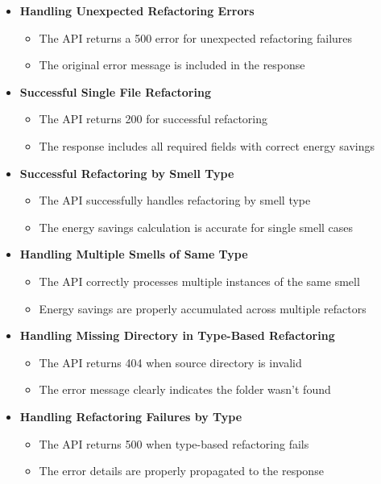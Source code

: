 \documentclass[12pt, titlepage]{article}
\begin{document}
\begin{itemize}
    \item \textbf{Handling Unexpected Refactoring Errors}
        \begin{itemize}
            \item The API returns a 500 error for unexpected refactoring failures
            \item The original error message is included in the response
        \end{itemize}

    \item \textbf{Successful Single File Refactoring}
        \begin{itemize}
            \item The API returns 200 for successful refactoring
            \item The response includes all required fields with correct energy savings
        \end{itemize}

    \item \textbf{Successful Refactoring by Smell Type}
        \begin{itemize}
            \item The API successfully handles refactoring by smell type
            \item The energy savings calculation is accurate for single smell cases
        \end{itemize}

    \item \textbf{Handling Multiple Smells of Same Type}
        \begin{itemize}
            \item The API correctly processes multiple instances of the same smell
            \item Energy savings are properly accumulated across multiple refactors
        \end{itemize}

    \item \textbf{Handling Missing Directory in Type-Based Refactoring}
        \begin{itemize}
            \item The API returns 404 when source directory is invalid
            \item The error message clearly indicates the folder wasn't found
        \end{itemize}

    \item \textbf{Handling Refactoring Failures by Type}
        \begin{itemize}
            \item The API returns 500 when type-based refactoring fails
            \item The error details are properly propagated to the response
        \end{itemize}


\end{itemize}
\end{document}
